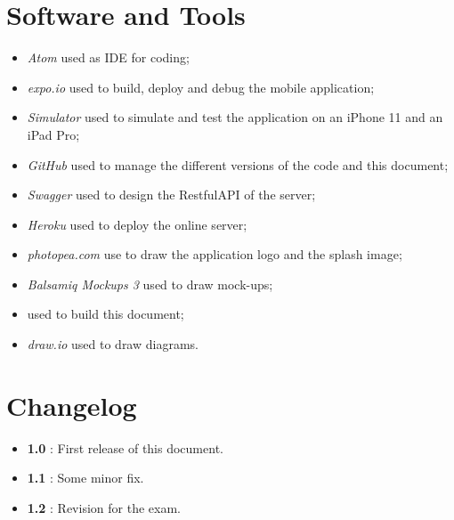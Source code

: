 \section{Software and Tools}
\begin{itemize}
  \item \textit{Atom} used as IDE for coding;
  \item \textit{expo.io} used to build, deploy and debug the mobile application;
  \item \textit{Simulator} used to simulate and test the application on an iPhone 11 and an iPad Pro;
  \item \textit{GitHub} used to manage the different versions of the code and this document;
  \item \textit{Swagger} used to design the RestfulAPI of the server;
  \item \textit{Heroku} used to deploy the online server;
  \item \textit{photopea.com} use to draw the application logo and the splash image;
  \item \textit{Balsamiq Mockups 3} used to draw mock-ups;
  \item \text{\LaTeX} used to build this document;
   \item \textit{draw.io} used to draw diagrams.
\end{itemize}


\section{Changelog} \label{Changelog}
\begin{itemize}
  \item \textbf{1.0} : First release of this document.
  \item \textbf{1.1} : Some minor fix.
  \item \textbf{1.2} : Revision for the exam.
\end{itemize}